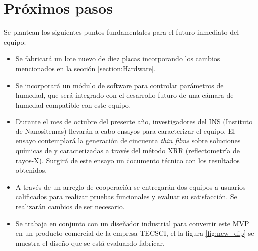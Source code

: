 \section{Próximos pasos}

Se plantean los siguientes puntos fundamentales para el futuro inmediato del equipo:  

\begin{itemize}

\item Se fabricará un lote nuevo de diez placas incorporando los cambios mencionados en la sección \ref{section:Hardware}. 

\item Se incorporará un módulo de software para controlar parámetros de humedad, que será integrado con el desarrollo futuro de una cámara de humedad compatible con este equipo.

\item Durante el mes de octubre del presente año, investigadores del INS (Instituto de Nanositemas) llevarán a cabo ensayos para caracterizar el equipo. El ensayo contemplará la generación de cincuenta \textit{thin films} sobre soluciones químicas de  y  caracterizadas a través del método XRR (reflectometría de rayos-X). Surgirá de este ensayo un documento técnico con los resultados obtenidos.  
 
\item A través de un arreglo de cooperación se entregarán dos equipos a usuarios calificados para realizar pruebas funcionales y evaluar su satisfacción. Se realizarán cambios de ser necesario.


\item Se trabaja en conjunto con un diseñador industrial para convertir este MVP en un producto comercial de la empresa TECSCI, el la figura \ref{fig:new_dip} se muestra el diseño que se está evaluando fabricar.



\end{itemize}
